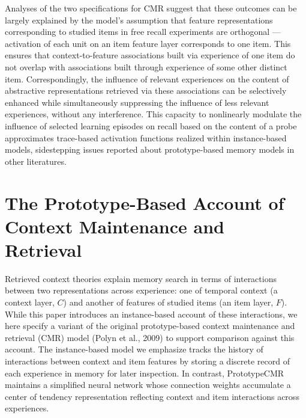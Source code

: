 \documentclass[
  letterpaper,
  DIV=11,
  numbers=noendperiod]{scrreport}
\begin{document}
Analyses of the two specifications for CMR suggest that these outcomes
can be largely explained by the model's assumption that feature
representations corresponding to studied items in free recall
experiments are orthogonal --- activation of each unit on an item
feature layer corresponds to one item. This ensures that
context-to-feature associations built via experience of one item do not
overlap with associations built through experience of some other
distinct item. Correspondingly, the influence of relevant experiences on
the content of abstractive representations retrieved via these
associations can be selectively enhanced while simultaneously
suppressing the influence of less relevant experiences, without any
interference. This capacity to nonlinearly modulate the influence of
selected learning episodes on recall based on the content of a probe
approximates trace-based activation functions realized within
instance-based models, sidestepping issues reported about
prototype-based memory models in other literatures.


\hypertarget{the-prototype-based-account-of-context-maintenance-and-retrieval}{%
\chapter{The Prototype-Based Account of Context Maintenance and
Retrieval}\label{the-prototype-based-account-of-context-maintenance-and-retrieval}}

Retrieved context theories explain memory search in terms of
interactions between two representations across experience: one of
temporal context (a context layer, \(C\)) and another of features of
studied items (an item layer, \(F\)). While this paper introduces an
instance-based account of these interactions, we here specify a variant
of the original prototype-based context maintenance and retrieval (CMR)
model (Polyn et al., 2009) to support comparison against this account.
The instance-based model we emphasize tracks the history of interactions
between context and item features by storing a discrete record of each
experience in memory for later inspection. In contrast, PrototypeCMR
maintains a simplified neural network whose connection weights
accumulate a center of tendency representation reflecting context and
item interactions across experiences.
\end{document}
